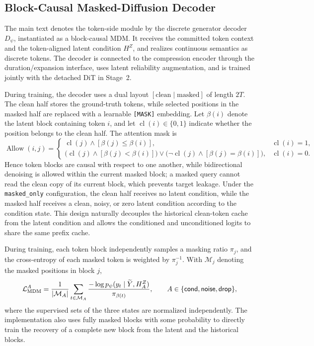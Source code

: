 \subsection{Block-Causal Masked-Diffusion Decoder}
\label{app:discrete-generator-details}

The main text denotes the token-side module by the discrete generator decoder $D_\psi$, instantiated as a block-causal MDM. It receives the committed token context and the token-aligned latent condition $H^Z$, and realizes continuous semantics as discrete tokens. The decoder is connected to the compression encoder through the duration/expansion interface, uses latent reliability augmentation, and is trained jointly with the detached DiT in Stage~2.

During training, the decoder uses a dual layout $[\text{clean}\mid\text{masked}]$ of length $2T$. The clean half stores the ground-truth tokens, while selected positions in the masked half are replaced with a learnable \texttt{[MASK]} embedding. Let $\beta(i)$ denote the latent block containing token $i$, and let $\operatorname{cl}(i)\in\{0,1\}$ indicate whether the position belongs to the clean half. The attention mask is
\begin{equation}
\operatorname{Allow}(i,j)=
\begin{cases}
\operatorname{cl}(j)\wedge[\beta(j)\le\beta(i)],
&\operatorname{cl}(i)=1,\\[3pt]
\big(\operatorname{cl}(j)\wedge[\beta(j)<\beta(i)]\big)
\vee
\big(\neg\operatorname{cl}(j)\wedge[\beta(j)=\beta(i)]\big),
&\operatorname{cl}(i)=0.
\end{cases}
\label{eq:app-workflow-mdm-mask}
\end{equation}
Hence token blocks are causal with respect to one another, while bidirectional denoising is allowed within the current masked block; a masked query cannot read the clean copy of its current block, which prevents target leakage. Under the \texttt{masked\_only} configuration, the clean half receives no latent condition, while the masked half receives a clean, noisy, or zero latent condition according to the condition state. This design naturally decouples the historical clean-token cache from the latent condition and allows the conditioned and unconditioned logits to share the same prefix cache.

During training, each token block independently samples a masking ratio $\pi_j$, and the cross-entropy of each masked token is weighted by $\pi_j^{-1}$. With $\mathcal M_j$ denoting the masked positions in block $j$,
\begin{equation}
    \mathcal{L}_{\mathrm{MDM}}^{A}
    =\frac{1}{|\mathcal M_A|}
    \sum_{t\in\mathcal M_A}
    \frac{-\log p_\psi(y_t\mid \widetilde Y,H_A^Z)}
         {\pi_{\beta(t)}},
    \qquad
    A\in\{\textsf{cond},\textsf{noise},\textsf{drop}\},
    \label{eq:app-workflow-mdm-loss}
\end{equation}
where the supervised sets of the three states are normalized independently. The implementation also uses fully masked blocks with some probability to directly train the recovery of a complete new block from the latent and the historical blocks.

